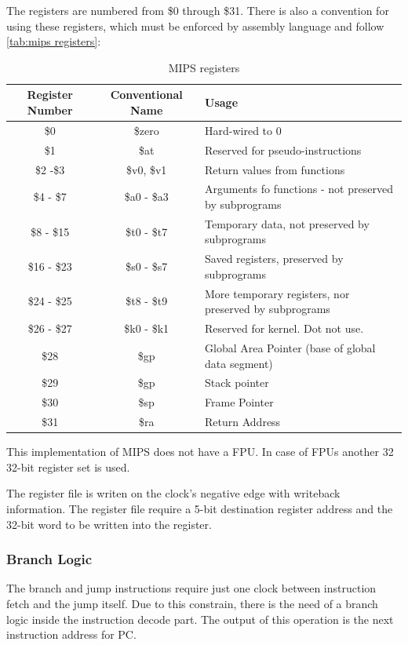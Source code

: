 The registers are numbered from \$0 through \$31. There is also a convention for using these registers, which must be enforced by assembly language and follow \autoref{tab:mips registers}:

\begin{table}[h!]
	\centering
	 \caption{MIPS registers}	
	\begin{tabular}{ccl}
		\toprule[2pt]
		\textbf{Register Number} & \textbf{Conventional Name} &\textbf{Usage}  \\
		\toprule[2pt]
		\$0 & \$zero & Hard-wired to 0 \\
		\$1 & \$at & Reserved for pseudo-instructions \\
		\$2 -\$3 & \$v0, \$v1 & Return values from functions \\
		\$4 - \$7 & \$a0 - \$a3 & Arguments fo functions - not preserved by subprograms \\
		\$8 - \$15 & \$t0 - \$t7 & Temporary data, not preserved by subprograms \\
		\$16 - \$23 & \$s0 - \$s7 & Saved registers, preserved by subprograms \\
		\$24 - \$25 & \$t8 - \$t9 & More temporary registers, nor preserved by subprograms  \\
		\$26 - \$27 & \$k0 - \$k1  & Reserved for kernel. Dot not use. \\
		\$28 & \$gp & Global Area Pointer (base of global data segment) \\
		\$29 & \$gp & Stack pointer \\
		\$30 & \$sp & Frame Pointer \\
		\$31 & \$ra & Return Address \\
		\bottomrule[2pt]
	\end{tabular} 
	\label{tab:mips registers}
\end{table}

This implementation of MIPS does not have a FPU. In case of FPUs another 32 32-bit register set is used.

The register file is writen on the clock's negative edge with writeback information. The register file require a 5-bit destination register address and the 32-bit word to be written into the register.
\subsubsection{Branch Logic}
The branch and jump instructions require just one clock between instruction fetch and the jump itself. Due to this constrain, there is the need of a branch logic inside
the instruction decode part. The output of this operation is the next instruction address for PC. 

